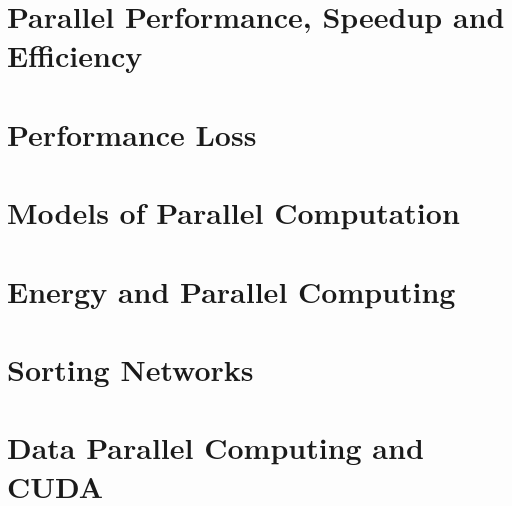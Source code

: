 \documentclass{article}
\begin{document}


\pagebreak

\section{Parallel Performance, Speedup and Efficiency}



\pagebreak

\section{Performance Loss}




\section{Models of Parallel Computation}




\section{Energy and Parallel Computing}



\pagebreak

\section{Sorting Networks}



\pagebreak

\section{Data Parallel Computing and CUDA}



\appendix
\end{document}
